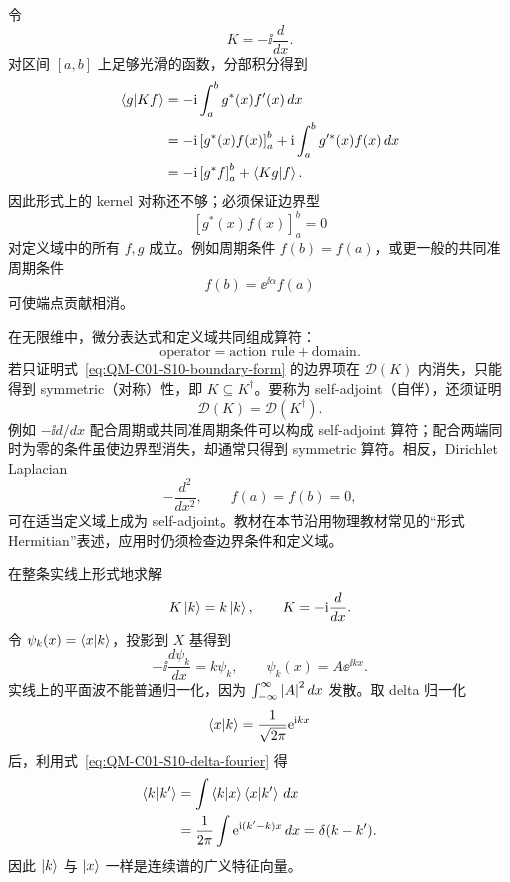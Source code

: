 
令
\[
  K=-\ii\frac{d}{dx}.
\]
对区间 $[a,b]$ 上足够光滑的函数，分部积分得到
\begin{align}
  \left\langle g \middle| Kf \right\rangle
  &=-\mathrm{i}\int_a^b g^*(x)f'(x)\,dx \\
  &=-\mathrm{i}\left[g^*(x)f(x)\right]_a^b
    +\mathrm{i}\int_a^b g'^*(x)f(x)\,dx \\
  &=-\mathrm{i}\left[g^*f\right]_a^b+\left\langle Kg \middle| f \right\rangle.
  \label{eq:QM-C01-S10-boundary-form}
\end{align}
因此形式上的 kernel 对称还不够；必须保证边界型
\begin{equation}
  \left[g^*(x)f(x)\right]_a^b=0
  \label{eq:QM-C01-S10-boundary-condition}
\end{equation}
对定义域中的所有 $f,g$ 成立。例如周期条件 $f(b)=f(a)$，或更一般的共同准周期条件
\[
  f(b)=\ee^{\ii\alpha}f(a)
\]
可使端点贡献相消。

在无限维中，微分表达式和定义域共同组成算符：
\[
  \text{operator}
  =\text{action rule}+\text{domain}.
\]
若只证明式~\eqref{eq:QM-C01-S10-boundary-form} 的边界项在 $\mathcal D(K)$ 内消失，只能得到 symmetric（对称）性，即 $K\subseteq K^\dagger$。要称为 self-adjoint（自伴），还须证明
\begin{equation}
  \boxed{\mathcal D(K)=\mathcal D(K^\dagger).}
  \label{eq:QM-C01-S10-self-adjoint-domain}
\end{equation}
例如 $-\ii d/dx$ 配合周期或共同准周期条件可以构成 self-adjoint 算符；配合两端同时为零的条件虽使边界型消失，却通常只得到 symmetric 算符。相反，Dirichlet Laplacian
\[
  -\frac{d^2}{dx^2},
  \qquad f(a)=f(b)=0,
\]
可在适当定义域上成为 self-adjoint。教材在本节沿用物理教材常见的“形式 Hermitian”表述，应用时仍须检查边界条件和定义域。


在整条实线上形式地求解
\begin{equation}
  K\left|k\right\rangle=k\left|k\right\rangle,
  \qquad K=-\mathrm{i}\frac{d}{dx}.
  \label{eq:QM-C01-S10-k-eigenproblem}
\end{equation}
令 $\psi_k(x)=\left\langle x \middle| k \right\rangle$，投影到 $X$ 基得到
\begin{equation}
  -\ii\frac{d\psi_k}{dx}=k\psi_k,
  \qquad
  \psi_k(x)=A\ee^{\ii kx}.
  \label{eq:QM-C01-S10-plane-wave-equation}
\end{equation}
实线上的平面波不能普通归一化，因为 $\int_{-\infty}^{\infty}\left|A\right|^2dx$ 发散。取 delta 归一化
\begin{equation}
  \left\langle x \middle| k \right\rangle=\frac1{\sqrt{2\pi}}\mathrm{e}^{\mathrm{i} kx}
  \label{eq:QM-C01-S10-x-k-overlap}
\end{equation}
后，利用式~\eqref{eq:QM-C01-S10-delta-fourier} 得
\begin{align}
  \left\langle k \middle| k' \right\rangle
  &=\int\left\langle k \middle| x \right\rangle\left\langle x \middle| k' \right\rangle\,dx \\
  &=\frac1{2\pi}\int\mathrm{e}^{\mathrm{i}(k'-k)x}\,dx
  =\delta(k-k').
  \label{eq:QM-C01-S10-k-delta-normalization}
\end{align}
因此 $\left|k\right\rangle$ 与 $\left|x\right\rangle$ 一样是连续谱的广义特征向量。

